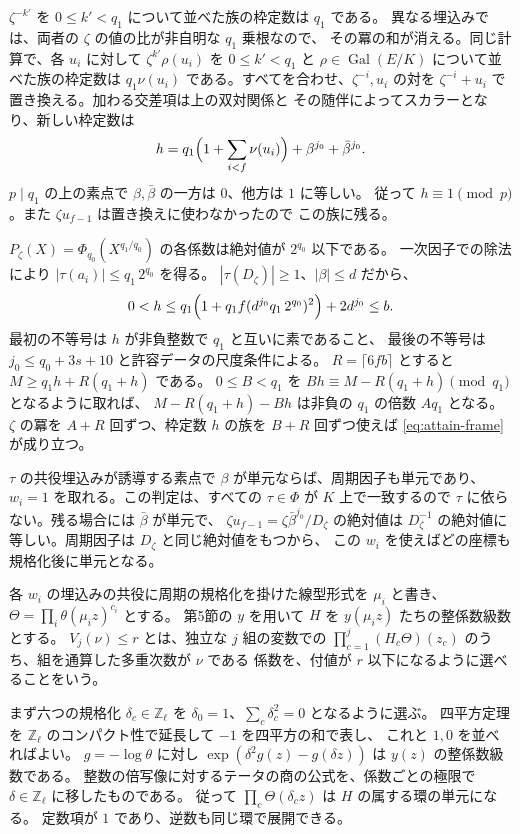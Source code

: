 \(\zeta^{-k'}\) を \(0\le k'<q_1\) について並べた族の枠定数は \(q_1\) である。
異なる埋込みでは、両者の \(\zeta\) の値の比が非自明な \(q_1\) 乗根なので、
その冪の和が消える。同じ計算で、各 \(u_i\) に対して
\(\zeta^{k'}\rho(u_i)\) を \(0\le k'<q_1\) と
\(\rho\in\operatorname{Gal}(E/K)\) について並べた族の枠定数は
\(q_1\nu(u_i)\) である。すべてを合わせ、\(\zeta^{-i},u_i\) の対を
\(\zeta^{-i}+u_i\) で置き換える。加わる交差項は上の双対関係と
その随伴によってスカラーとなり、新しい枠定数は
\[
 h=q_1\Bigl(1+\sum_{i<f}\nu(u_i)\Bigr)+\beta^{j_0}+\bar\beta^{j_0}.
\]
\(p\mid q_1\) の上の素点で \(\beta,\bar\beta\) の一方は \(0\)、他方は \(1\) に等しい。
従って \(h\equiv1\pmod p\)。また \(\zeta u_{f-1}\) は置き換えに使わなかったので
この族に残る。

\(P_\zeta(X)=\Phi_{q_0}(X^{q_1/q_0})\) の各係数は絶対値が \(2^{q_0}\) 以下である。
一次因子での除法により \(|\tau(a_i)|\le q_1\,2^{q_0}\) を得る。
\(|\tau(D_\zeta)|\ge1\)、\(|\beta|\le d\) だから、
\[
 0<h\le q_1\Bigl(1+q_1 f(d^{j_0}q_1\,2^{q_0})^2\Bigr)+2d^{j_0}\le b .
\]
最初の不等号は \(h\) が非負整数で \(q_1\) と互いに素であること、
最後の不等号は \(j_0\le q_0+3s+10\) と許容データの尺度条件による。
\(R=\lceil6fb\rceil\) とすると \(M\ge q_1h+R(q_1+h)\) である。
\(0\le B<q_1\) を \(Bh\equiv M-R(q_1+h)\pmod{q_1}\) となるように取れば、
\(M-R(q_1+h)-Bh\) は非負の \(q_1\) の倍数 \(Aq_1\) となる。
\(\zeta\) の冪を \(A+R\) 回ずつ、枠定数 \(h\) の族を \(B+R\) 回ずつ使えば
\eqref{eq:attain-frame} が成り立つ。

\(\tau\) の共役埋込みが誘導する素点で \(\beta\) が単元ならば、周期因子も単元であり、
\(w_i=1\) を取れる。この判定は、すべての \(\tau\in\Phi\) が \(K\) 上で一致するので
\(\tau\) に依らない。残る場合には \(\bar\beta\) が単元で、
\(\zeta u_{f-1}=\zeta\bar\beta^{j_0}/D_\zeta\) の絶対値は
\(D_\zeta^{-1}\) の絶対値に等しい。周期因子は \(D_\zeta\) と同じ絶対値をもつから、
この \(w_i\) を使えばどの座標も規格化後に単元となる。

各 \(w_i\) の埋込みの共役に周期の規格化を掛けた線型形式を
\(\mu_i\) と書き、\(\Theta=\prod_i\theta(\mu_i z)^{c_i}\) とする。
第5節の \(y\) を用いて \(H\) を \(y(\mu_i z)\) たちの整係数級数とする。
\(V_j(\nu)\le r\) とは、独立な \(j\) 組の変数での
\(\prod_{c=1}^j(H_c\Theta)(z_c)\) のうち、組を通算した多重次数が \(\nu\) である
係数を、付値が \(r\) 以下になるように選べることをいう。

まず六つの規格化 \(\delta_c\in\mathbb Z_\ell\) を
\(\delta_0=1\)、\(\sum_c\delta_c^2=0\) となるように選ぶ。
四平方定理を \(\mathbb Z_\ell\) のコンパクト性で延長して \(-1\) を四平方の和で表し、
これと \(1,0\) を並べればよい。
\(g=-\log\theta\) に対し
\(\exp(\delta^2 g(z)-g(\delta z))\) は \(y(z)\) の整係数級数である。
整数の倍写像に対するテータの商の公式を、係数ごとの極限で
\(\delta\in\mathbb Z_\ell\) に移したものである。
従って \(\prod_c\Theta(\delta_c z)\) は \(H\) の属する環の単元になる。
定数項が \(1\) であり、逆数も同じ環で展開できる。

